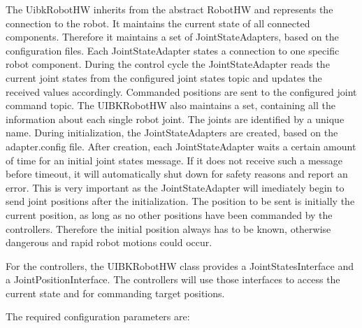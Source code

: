 The UibkRobotHW inherits from the abstract RobotHW and represents the connection to the robot. It maintains the current state of all connected components. Therefore it maintains a set of JointStateAdapters, based on the configuration files. Each JointStateAdapter states a connection to one specific robot component. During the control cycle the JointStateAdapter reads the current joint states from the configured joint states topic and updates the received values accordingly. Commanded positions are sent to the configured joint command topic. The UIBKRobotHW also maintains a set, containing all the information about each single robot joint. The joints are identified by a unique name. During initialization, the JointStateAdapters are created, based on the adapter.config file. After creation, each JointStateAdapter waits a certain amount of time for an initial joint states message. If it does not receive such a message before timeout, it will automatically shut down for safety reasons and report an error. This is very important as the JointStateAdapter will imediately begin to send joint positions after the initialization. The position to be sent is initially the current position, as long as no other positions have been commanded by the controllers. Therefore the initial position always has to be known, otherwise dangerous and rapid robot motions could occur.

For the controllers, the UIBKRobotHW class provides a JointStatesInterface and a JointPositionInterface. The controllers will use those interfaces to access the current state and for commanding target positions.

The required configuration parameters are:

